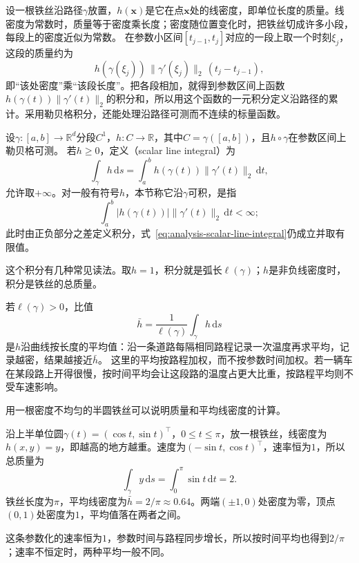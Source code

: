 设一根铁丝沿路径$\gamma$放置，$h(\bm x)$是它在点$\bm x$处的线密度，即单位长度的质量。线密度为常数时，质量等于密度乘长度；密度随位置变化时，把铁丝切成许多小段，每段上的密度近似为常数。
在参数小区间$[t_{j-1},t_j]$对应的一段上取一个时刻$\xi_j$，这段的质量约为
\[
 h(\gamma(\xi_j))\,\lVert\gamma'(\xi_j)\rVert_2\,(t_j-t_{j-1}),
\]
即“该处密度”乘“该段长度”。把各段相加，就得到参数区间上函数$h(\gamma(t))\lVert\gamma'(t)\rVert_2$的积分和，所以用这个函数的一元积分定义沿路径的累计。采用勒贝格积分，还能处理沿路径可测而不连续的标量函数。
\begin{definition}[第一类路径积分]
设$\gamma:[a,b]\to\mathbb R^d$分段$C^1$，$h:C\to\mathbb R$，其中$C=\gamma([a,b])$，且$h\circ\gamma$在参数区间上勒贝格可测。
若$h\geq0$，定义（scalar line integral）为
\begin{equation}
 \int_\gamma h\,\mathrm ds
 =\int_a^b h(\gamma(t))\lVert\gamma'(t)\rVert_2\,\mathrm dt,
 \label{eq:analysis-scalar-line-integral}
\end{equation}
允许取$+\infty$。对一般有符号$h$，本节称它沿$\gamma$可积，是指
\[
 \int_a^b |h(\gamma(t))|\lVert\gamma'(t)\rVert_2\,\mathrm dt<\infty;
\]
此时由正负部分之差定义积分，式~\eqref{eq:analysis-scalar-line-integral}仍成立并取有限值。
\end{definition}

这个积分有几种常见读法。取$h=1$，积分就是弧长$\ell(\gamma)$；$h$是非负线密度时，积分是铁丝的总质量。

若$\ell(\gamma)>0$，比值
\[
 \bar h=\frac1{\ell(\gamma)}\int_\gamma h\,\mathrm ds
\]
是$h$沿曲线按长度的平均值：沿一条道路每隔相同路程记录一次温度再求平均，记录越密，结果越接近$\bar h$。
这里的平均按路程加权，而不按参数时间加权。若一辆车在某段路上开得很慢，按时间平均会让这段路的温度占更大比重，按路程平均则不受车速影响。

用一根密度不均匀的半圆铁丝可以说明质量和平均线密度的计算。
\begin{example}[上半圆铁丝的质量与平均线密度]
\label{ex:analysis-semicircle-wire}
沿上半单位圆$\gamma(t)=(\cos t,\sin t)^\top$，$0\leq t\leq\pi$，放一根铁丝，线密度为$h(x,y)=y$，即越高的地方越重。速度为$(-\sin t,\cos t)^\top$，速率恒为$1$，所以总质量为
\[
 \int_\gamma y\,\mathrm ds=\int_0^\pi\sin t\,\mathrm dt=2.
\]
铁丝长度为$\pi$，平均线密度为$\bar h=2/\pi\approx0.64$。两端$(\pm1,0)$处密度为零，顶点$(0,1)$处密度为$1$，平均值落在两者之间。
\end{example}
这条参数化的速率恒为$1$，参数时间与路程同步增长，所以按时间平均也得到$2/\pi$；速率不恒定时，两种平均一般不同。

